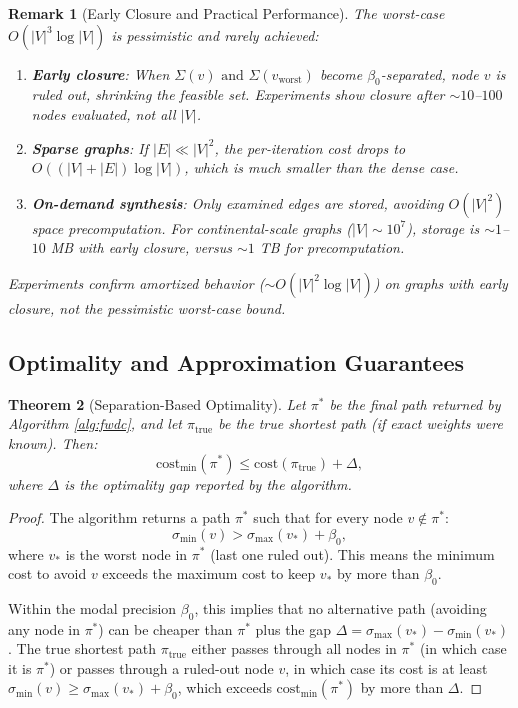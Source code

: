 \documentclass[twocolumn,11pt,a4paper]{article}
\newtheorem{theorem}{Theorem}[section]
\newtheorem{remark}[theorem]{Remark}
\theoremstyle{definition}
\begin{document}
\begin{remark}[Early Closure and Practical Performance]
The worst-case $O(|V|^3 \log |V|)$ is pessimistic and rarely achieved:
\begin{enumerate}
\item \textbf{Early closure}: When $\Sigma(v) \text{ and } \Sigma(v_{\text{worst}})$ become $\beta_0$-separated, node $v$ is ruled out, shrinking the feasible set. Experiments show closure after $\sim 10$--$100$ nodes evaluated, not all $|V|$.
\item \textbf{Sparse graphs}: If $|E| \ll |V|^2$, the per-iteration cost drops to $O((|V| + |E|) \log |V|)$, which is much smaller than the dense case.
\item \textbf{On-demand synthesis}: Only examined edges are stored, avoiding $O(|V|^2)$ space precomputation. For continental-scale graphs ($|V| \sim 10^7$), storage is $\sim 1$--$10$ MB with early closure, versus $\sim 1$ TB for precomputation.
\end{enumerate}
Experiments confirm amortized behavior ($\sim O(|V|^2 \log |V|)$) on graphs with early closure, not the pessimistic worst-case bound.
\end{remark}

\subsection{Optimality and Approximation Guarantees}

\begin{theorem}[Separation-Based Optimality]
\label{thm:optimality}
Let $\pi^*$ be the final path returned by Algorithm \ref{alg:fwdc}, and let $\pi_{\text{true}}$ be the true shortest path (if exact weights were known). Then:
\begin{equation}
\text{cost}_{\min}(\pi^*) \leq \text{cost}(\pi_{\text{true}}) + \Delta,
\end{equation}
where $\Delta$ is the optimality gap reported by the algorithm.
\end{theorem}

\begin{proof}
The algorithm returns a path $\pi^*$ such that for every node $v \notin \pi^*$:
\begin{equation}
\sigma_{\min}(v) > \sigma_{\max}(v_*) + \beta_0,
\end{equation}
where $v_*$ is the worst node in $\pi^*$ (last one ruled out). This means the minimum cost to avoid $v$ exceeds the maximum cost to keep $v_*$ by more than $\beta_0$.

Within the modal precision $\beta_0$, this implies that no alternative path (avoiding any node in $\pi^*$) can be cheaper than $\pi^*$ plus the gap $\Delta = \sigma_{\max}(v_*) - \sigma_{\min}(v_*)$. The true shortest path $\pi_{\text{true}}$ either passes through all nodes in $\pi^*$ (in which case it is $\pi^*$) or passes through a ruled-out node $v$, in which case its cost is at least $\sigma_{\min}(v) \geq \sigma_{\max}(v_*) + \beta_0$, which exceeds $\text{cost}_{\min}(\pi^*)$ by more than $\Delta$.
\end{proof}
\end{document}
